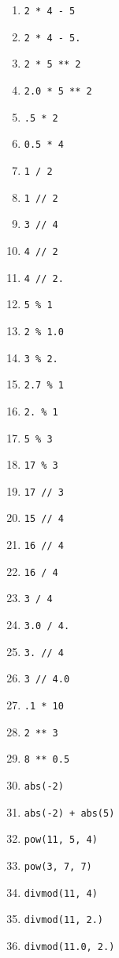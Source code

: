 \documentclass[a4paper]{article}
\begin{document}
\begin{multicols}{3}
\begin{enumerate}[label=\arabic*.]
    \item \verb|2 * 4 - 5|
    \item \verb|2 * 4 - 5.|
    \item \verb|2 * 5 ** 2|
    \item \verb|2.0 * 5 ** 2|
    \item \verb|.5 * 2|
    \item \verb|0.5 * 4|
    \item \verb|1 / 2|
    \item \verb|1 // 2|
    \item \verb|3 // 4|
    \item \verb|4 // 2|
    \item \verb|4 // 2.|
    \item \verb|5 % 1|
    \item \verb|2 % 1.0|
    \item \verb|3 % 2.|
    \item \verb|2.7 % 1|
    \item \verb|2. % 1|
    \item \verb|5 % 3|
    \item \verb|17 % 3|

    \item \verb|17 // 3|
    \item \verb|15 // 4|
    \item \verb|16 // 4|
    \item \verb|16 / 4|
    \item \verb|3 / 4|
    \item \verb|3.0 / 4.|
    \item \verb|3. // 4|
    \item \verb|3 // 4.0|

    \item \verb|.1 * 10|

    \item \verb|2 ** 3|
    \item \verb|8 ** 0.5|
    \item \verb|abs(-2)|
    \item \verb|abs(-2) + abs(5)|
    \item \verb|pow(11, 5, 4)|
    \item \verb|pow(3, 7, 7)|
    \item \verb|divmod(11, 4)|
    \item \verb|divmod(11, 2.)|
    \item \verb|divmod(11.0, 2.)|

\end{enumerate}
\end{multicols}
\end{document}
